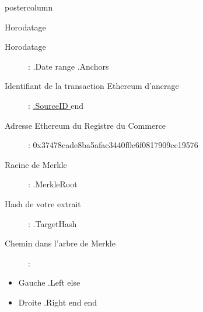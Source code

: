 \documentclass[roundedcorners=true, titleposition=center]{beamerthemeruhuisstijlposter}
\begin{document}
\begin{frame}
\begin{columns}
\begin{column}{0.95\textwidth}
\begin{beamercolorbox}[center, wd=\textwidth]{postercolumn}
\begin{minipage}[T]{0.95\textwidth}
    \hfill
\parbox[t][\columnheight]{\textwidth}{%

\begin{block}{Horodatage}
\begin{description}
\item [Horodatage] :\linebreak
{{ .Date }}
{{ range .Anchors }}
\item [Identifiant de la transaction Ethereum d’ancrage] :\linebreak
\href{https://etherscan.io/tx/{{ .SourceID }} }{ {{.SourceID }} }
{{ end }}
\item[Adresse Ethereum du Registre du Commerce] :\linebreak
0x37478cade8ba5afac3440f0c6f0817909cc19576
\item[Racine de Merkle] :\linebreak
{{ .MerkleRoot }}
\item[Hash de votre extrait] :\linebreak
{{ .TargetHash }}
\item[Chemin dans l’arbre de Merkle] :
\end{description}
\begin{itemize}
{{ range .Proof }}
    {{ if .Left }}
        \item Gauche {{ .Left }}
    {{ else }}
        \item Droite {{ .Right }}
    {{ end }}
{{ end }}
\end{itemize}
\end{block}
}
\end{minipage}
\end{beamercolorbox}
\end{column}
\end{columns}
\end{frame}
\end{document}

